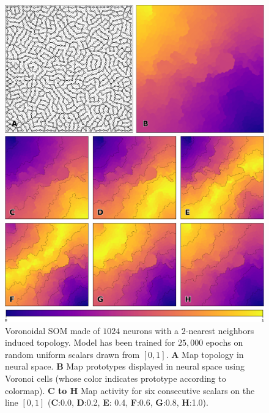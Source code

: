 \begin{figure}
  \includegraphics[width=\columnwidth]{figures/vsom-scalar-1.pdf}

  \vspace{2mm}
  
  \includegraphics[width=\columnwidth]{figures/vsom-scalar-2.pdf}

  \vspace{2mm}
  
  \includegraphics[width=\columnwidth]{figures/colormap.pdf}
  
  \caption{Voronoidal SOM made of $1024$ neurons with a $2$-nearest neighbors
    induced topology. Model has been trained for $25,000$ epochs on random
    uniform scalars drawn from $[0, 1]$. \textbf{A} Map topology in neural
    space. \textbf{B} Map prototypes displayed in neural space using Voronoi
    cells (whose color indicates prototype according to colormap). \textbf{C to
      H} Map activity for six consecutive scalars on the line $[0, 1]$
    (\textbf{C}:0.0, \textbf{D}:0.2, \textbf{E}: 0.4, \textbf{F}:0.6,
    \textbf{G}:0.8, \textbf{H}:1.0).}
    \label{fig:one-dim}
\end{figure}

